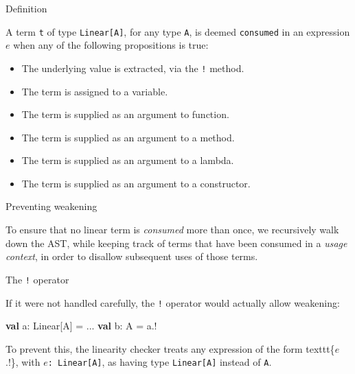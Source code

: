 \documentclass[ignorenonframetext,]{beamer}
\newenvironment{Shaded}{}{}
\newcommand{\KeywordTok}[1]{\textcolor[rgb]{0.00,0.44,0.13}{\textbf{#1}}}
\newcommand{\NormalTok}[1]{#1}
\providecommand{\tightlist}{%
  \setlength{\itemsep}{0pt}\setlength{\parskip}{0pt}}
\begin{document}
\begin{frame}{%
\protect\hypertarget{definition}{%
Definition}}

A term \texttt{t} of type \texttt{Linear[A]}, for any type \texttt{A},
is deemed \texttt{consumed} in an expression \(e\) when any of the
following propositions is true:

\begin{itemize}
\tightlist
\item
  The underlying value is extracted, via the \texttt{!} method.
\item
  The term is assigned to a variable.
\item
  The term is supplied as an argument to function.
\item
  The term is supplied as an argument to a method.
\item
  The term is supplied as an argument to a lambda.
\item
  The term is supplied as an argument to a constructor.
\end{itemize}

\end{frame}

\begin{frame}{%
\protect\hypertarget{preventing-weakening}{%
Preventing weakening}}

To ensure that no linear term is \textit{consumed} more than once, we
recursively walk down the AST, while keeping track of terms that have
been consumed in a \textit{usage context}, in order to disallow
subsequent uses of those terms.

\end{frame}

\begin{frame}[fragile]{%
\protect\hypertarget{the-operator}{%
The \texttt{!} operator}}

If it were not handled carefully, the \texttt{!} operator would actually
allow weakening:

\begin{Shaded}
\begin{Highlighting}[]
\KeywordTok{val}\NormalTok{ a: Linear[A] = ...}
\KeywordTok{val}\NormalTok{ b: A = a.!}
\end{Highlighting}
\end{Shaded}

To prevent this, the linearity checker treats any expression of the form
texttt\{\(e\).!\}, with \texttt{$e$:\,Linear[A]}, as having type
\texttt{Linear[A]} instead of \texttt{A}.

\end{frame}
\end{document}

